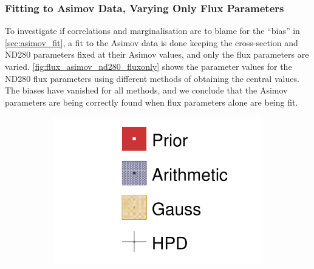 \subsubsection{Fitting to Asimov Data, Varying Only Flux Parameters}
To investigate if correlations and marginalisation are to blame for the ``bias'' in \autoref{sec:asimov_fit}, a fit to the Asimov data is done keeping the cross-section and ND280 parameters fixed at their Asimov values, and only the flux parameters are varied. \autoref{fig:flux_asimov_nd280_fluxonly} shows the parameter values for the ND280 flux parameters using different methods of obtaining the central values. The biases have vanished for all methods, and we conclude that the Asimov parameters are being correctly found when flux parameters alone are being fit.

\begin{figure}[h]
	\begin{subfigure}[t]{0.10\textwidth}
		\includegraphics[width=\textwidth, trim={0mm 0mm 0mm 0mm}, clip,page=1]{figures/mach3/Asimov/2017b_Asimov_July2017_FixND280_FixXsec_0_drawPar}
	\end{subfigure}
	

\end{figure}
